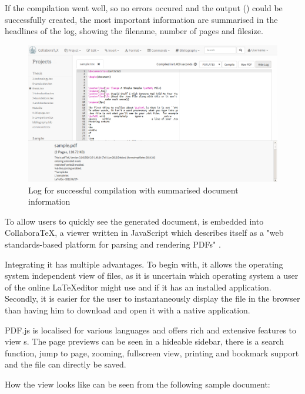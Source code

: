 If the compilation went well, so no errors occured and the output () could be successfully created, the most important information are summarised in the headlines of the log, showing the filename, number of pages and filesize.

\begin{figure}[H]
	\centering
		\includegraphics[width=\textwidth]{images/screenshot-compile-log-success.png}
	\caption{Log for successful compilation with summarised document information}
\end{figure}

\pagebreak

\label{pdf-viewer}

To allow users to quickly see the generated document,  is embedded into CollaboraTeX, a  viewer written in JavaScript which describes itself as a "web standards-based platform for parsing and rendering PDFs" \cite{website:pdf-js}.

Integrating it has multiple advantages. To begin with, it allows the operating system independent view of  files, as it is uncertain which operating system a user of the online \LaTeX editor might use and if it has an installed  application. Secondly, it is easier for the user to instantaneously display the file in the browser than having him to download and open it with a native application.

PDF.js is localised for various languages and offers rich and extensive features to view s. The page previews can be seen in a hideable sidebar, there is a search function, jump to page, zooming, fullscreen view, printing and bookmark support and the file can directly be saved.

How the  view looks like can be seen from the following sample document:

